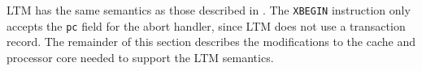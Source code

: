LTM has the same semantics as those described in .  The
\texttt{XBEGIN} instruction only accepts the \texttt{pc} field for the
abort handler, since LTM does not use a transaction record.  The
remainder of this section describes the modifications to the cache and
processor core needed to support the LTM semantics.


